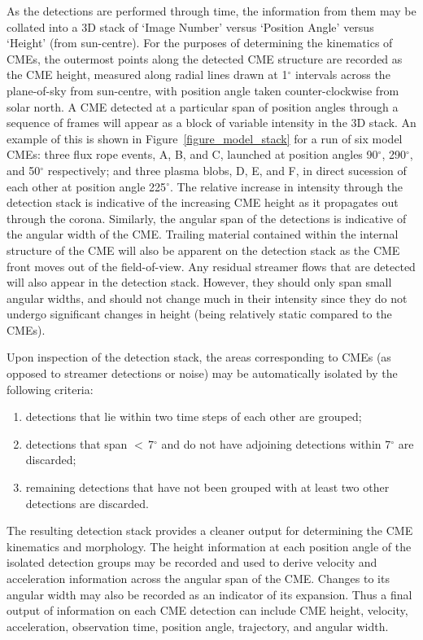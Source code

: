 \documentclass[namedreferences]{SolarPhysics}
\begin{document}
\begin{article}
As the detections are performed through time, the information from them may be collated into a 3D stack of `Image Number' versus `Position Angle' versus `Height' (from sun-centre). For the purposes of determining the kinematics of CMEs, the outermost points along the detected CME structure are recorded as the CME height, measured along radial lines drawn  at 1$^{\circ}$ intervals across the plane-of-sky from sun-centre, with position angle taken counter-clockwise from solar north. A CME detected at a particular span of position angles through a sequence of frames will appear as a block of variable intensity in the 3D stack. An example of this is shown  in Figure~\ref{figure_model_stack} for a run of six model CMEs: three flux rope events, A, B, and C, launched at position angles 90$^{\circ}$, 290$^{\circ}$, and 50$^{\circ}$ respectively; and three plasma blobs, D, E, and F, in direct sucession of each other at position angle 225$^{\circ}$. The relative increase in intensity through the detection stack is indicative of the increasing CME height as it propagates out through the corona. Similarly, the angular span of the detections is indicative of the angular width of the CME. Trailing material contained within the internal structure of the CME will also be apparent on the detection stack as the CME front moves out of the field-of-view. Any residual streamer flows that are detected will also appear in the detection stack. However, they should only span small angular widths, and should not change much in their intensity since they do not undergo significant changes in height (being relatively static compared to the CMEs).

Upon inspection of the detection stack, the areas corresponding to CMEs (as opposed to streamer detections or noise) may be automatically isolated by the following criteria:
\begin{enumerate}
\item detections that lie within two time steps of each other are grouped;
\item detections that span $<$\,7$^{\circ}$ and do not have adjoining detections within 7$^{\circ}$ are discarded;
\item remaining detections that have not been grouped with at least two other detections are discarded.
\end{enumerate}
The resulting detection stack provides a cleaner output for determining the CME kinematics and morphology. The height information at each position angle of the isolated detection groups may be recorded and used to derive velocity and acceleration information across the angular span of the CME. Changes to its angular width may also be recorded as an indicator of its expansion. Thus a final output of information on each CME detection can include CME height, velocity, acceleration, observation time, position angle, trajectory, and angular width.


\end{article}
\end{document}
